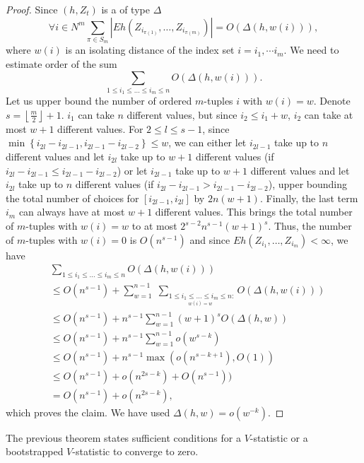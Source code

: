 \documentclass{article} %
\newcommand{\ev}{E}
\begin{document}
\begin{proof}
Since  $(h,Z_{t})$ is a  of type $\varDelta$
\[
\forall i \in N^{m} \sum_{\pi\in S_{m}}\left| \ev h\left(Z_{i_{\pi(1)}},\ldots,Z_{i_{\pi(m)}}\right)\right| = O( \varDelta(h,w(i)) ),
\]
where $w(i)$ is an isolating distance of the index set $i = i_1,\cdots i_m$. We need to estimate order of the sum 
\begin{equation*}
 \sum_{1\leq i_{1}\leq\ldots\leq i_{m}\leq n}  O( \varDelta(h,w(i)) ).
\end{equation*}
Let us upper bound the number of ordered $m$-tuples $i$ with $w(i)=w$.  Denote $s=\left\lfloor \frac{m}{2}\right\rfloor +1$. 
$i_{1}$ can take $n$ different values, but since $i_{2}\leq i_{1}+w$,
$i_{2}$ can take at most $w+1$ different values.
For $2\leq l\leq s-1$, since $\min\left\{ i_{2l}-i_{2l-1},i_{2l-1}-i_{2l-2}\right\} \leq w$,
we can either let $i_{2l-1}$ take up to $n$ different values and
let $i_{2l}$ take up to $w+1$ different values (if $i_{2l}-i_{2l-1}\leq i_{2l-1}-i_{2l-2}$)
or let $i_{2l-1}$ take up to $w+1$ different values and let $i_{2l}$
take up to $n$ different values (if $i_{2l}-i_{2l-1}>i_{2l-1}-i_{2l-2}$),
upper bounding the total number of choices for $\left[i_{2l-1},i_{2l}\right]$
by $2n(w+1)$. Finally, the last term $i_{m}$ can always have at
most $w+1$ different values.  
This brings the total number of $m$-tuples with $w(i)=w$ to at most $2^{\ensuremath{s-2}}n^{s-1}(w+1)^{s}$.
Thus, the number of $m$-tuples with $w(i)=0$ is $O(n^{s-1})$ and
since $\ev  h\left(Z_{i_{1}},\ldots,Z_{i_{m}}\right) < \infty$, we have
\begin{align*}
 &  \sum_{1\leq i_{1}\leq\ldots\leq i_{m}\leq n}O( \varDelta(h,w(i)) )\\
 & \leq O(n^{s-1})+\sum_{w=1}^{n-1}\;\sum_{\underset{w(i)=w}{1\leq i_{1}\leq\ldots\leq i_{m}\leq n}:} O( \varDelta(h,w(i)) )\\
 & \leq O(n^{s-1})+ n^{s-1}\sum_{w=1}^{n-1}(w+1)^{s} O(\varDelta(h,w))\\
 & \leq O(n^{s-1})+n^{s-1}\sum_{w=1}^{n-1}o(w^{s-k})\\
 & \leq O(n^{s-1})+n^{s-1}\max( o(n^{s-k+1}),O(1))\\
  & \leq O(n^{s-1})+o(n^{2s-k})+ O(n^{s-1}))\\
 &=  O(n^{s-1})+o(n^{2s-k}),
\end{align*}
which proves the claim. We have used $\varDelta(h,w)=o(w^{-k})$. 
\end{proof}
The previous theorem states sufficient conditions for a $V$-statistic  or a bootstrapped $V$-statistic to  converge to zero.
\end{document}
